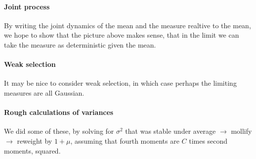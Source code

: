 \documentclass{article}
\begin{document}
\paragraph{Joint process}
By writing the joint dynamics of the mean and the measure realtive to the mean,
we hope to show that the picture above makes sense,
that in the limit we can take the measure as deterministic given the mean.

\paragraph{Weak selection}
It may be nice to consider weak selection,
in which case perhaps the limiting measures are all Gaussian.

\paragraph{Rough calculations of variances}
We did some of these,
by solving for $\sigma^2$ that was stable under
average $\to$ mollify $\to$ reweight by $1+\mu$,
assuming that fourth moments are $C$ times second moments, squared.
\end{document}
